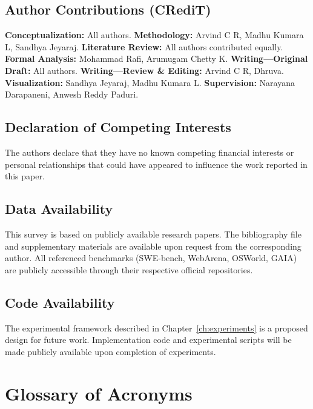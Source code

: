 \documentclass[12pt,a4paper]{report}
\theoremstyle{definition}
\begin{document}
\section*{Author Contributions (CRediT)}
\noindent\textbf{Conceptualization:} All authors. \textbf{Methodology:} Arvind C R, Madhu Kumara L, Sandhya Jeyaraj. \textbf{Literature Review:} All authors contributed equally. \textbf{Formal Analysis:} Mohammad Rafi, Arumugam Chetty K. \textbf{Writing---Original Draft:} All authors. \textbf{Writing---Review \& Editing:} Arvind C R, Dhruva. \textbf{Visualization:} Sandhya Jeyaraj, Madhu Kumara L. \textbf{Supervision:} Narayana Darapaneni, Anwesh Reddy Paduri.

\section*{Declaration of Competing Interests}
The authors declare that they have no known competing financial interests or personal relationships that could have appeared to influence the work reported in this paper.

\section*{Data Availability}
This survey is based on publicly available research papers. The bibliography file and supplementary materials are available upon request from the corresponding author. All referenced benchmarks (SWE-bench, WebArena, OSWorld, GAIA) are publicly accessible through their respective official repositories.

\section*{Code Availability}
The experimental framework described in Chapter~\ref{ch:experiments} is a proposed design for future work. Implementation code and experimental scripts will be made publicly available upon completion of experiments.

\appendix

\chapter{Glossary of Acronyms}
\label{app:glossary}
\end{document}
